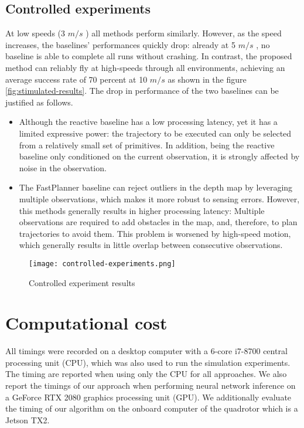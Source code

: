 \subsection{Controlled experiments}
At
low speeds (3 $m/s$ ) all methods perform similarly. However, as the
speed increases, the baselines’ performances quickly drop: already at
5 $m/s$ , no baseline is able to complete all runs without crashing. In
contrast, the proposed method can reliably fly at high-speeds through all environments, achieving an average success rate of 70 percent at 10 $m/s$ as shown in the figure \ref{fig:stimulated-results}. The
drop in performance of the two baselines can be justified as follows.
\begin{itemize}
	\item Although the reactive \cite{reactive_method} baseline has a low processing latency, yet it has a limited expressive power: the trajectory to be executed can only be selected from a relatively small set of primitives. In addition, being the reactive \cite{reactive_method} baseline only conditioned on the current observation, it is strongly affected by noise in the observation.
	\item The FastPlanner \cite{fastPlanner} baseline can reject outliers in the depth map by leveraging multiple observations, which makes it more robust to sensing errors. However, this methods generally results in higher processing latency: Multiple observations are required to add
obstacles in the map, and, therefore, to plan trajectories to avoid them.
This problem is worsened by high-speed motion, which generally results in little overlap between consecutive observations.
\end{itemize}

\begin{figure}[!h]
	\texttt{[image: controlled-experiments.png]}
	\caption{Controlled experiment results}
	\label{fig:stimulated_results}
\end{figure}


\section{Computational cost}

All timings were recorded on a desktop computer
with a 6-core i7-8700 central processing unit (CPU), which was also
used to run the simulation experiments. The timing are reported when using only the CPU for all approaches.
We also report the timings of our approach when performing neural
network inference on a GeForce RTX 2080 graphics processing unit
(GPU). We additionally
evaluate the timing of our algorithm on the onboard computer of the
quadrotor which is a Jetson TX2.

